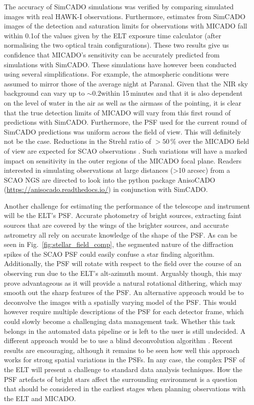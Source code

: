 The accuracy of SimCADO simulations was verified by comparing simulated images with real HAWK-I observations. Furthermore, estimates from SimCADO images of the detection and saturation limits for observations with MICADO fall within 0.1\m of the values given by the ELT exposure time calculator (after normalising the two optical train configurations). These two results give us confidence that MICADO's sensitivity can be accurately predicted from simulations with SimCADO. These simulations have however been conducted using several simplifications. For example, the atmospheric conditions were assumed to mirror those of the average night at Paranal. Given that the NIR sky background can vary up to $\sim 0.2$\m within 15\,minutes \citep{moreels08} and that it is also dependent on the level of water in the air as well as the airmass of the pointing, it is clear that the true detection limits of MICADO will vary from this first round of predictions with SimCADO. Furthermore, the PSF used for the current round of SimCADO predictions was uniform across the field of view. This will definitely not be the case. Reductions in the Strehl ratio of $>50\,\%$ over the MICADO field of view are expected for SCAO observations \citep{clenet2015}. Such variations will have a marked impact on sensitivity in the outer regions of the MICADO focal plane. Readers interested in simulating observations at large distances (>10 arcsec) from a SCAO NGS are directed to look into the python package AnisoCADO (\url{https://anisocado.readthedocs.io/}) in conjunction with SimCADO.

Another challenge for estimating the performance of the telescope and instrument will be the ELT's PSF. Accurate photometry of bright sources, extracting faint sources that are covered by the wings of the brighter sources, and accurate astrometry all rely on accurate knowledge of the shape of the PSF. As can be seen in Fig.~\ref{fig:stellar_field_comp}, the segmented nature of the diffraction spikes of the SCAO PSF could easily confuse a star finding algorithm. Additionally, the PSF will rotate with respect to the field over the course of an observing run due to the ELT's alt-azimuth mount. Arguably though, this may prove advantageous as it will provide a natural rotational dithering, which may smooth out the sharp features of the PSF. An alternative approach would be to deconvolve the images with a spatially varying model of the PSF. This would however require multiple descriptions of the PSF for each detector frame, which could slowly become a challenging data management task. Whether this task belongs in the automated data pipeline or is left to the user is still undecided. A different approach would be to use a blind deconvolution algorithm \citep{vorontsov2017}. Recent results are encouraging, although it remains to be seen how well this approach works for strong spatial variations in the PSFs. In any case, the complex PSF of the ELT will present a challenge to standard data analysis techniques. How the PSF artefacts of bright stars affect the surrounding environment is a question that should be considered in the earliest stages when planning observations with the ELT and MICADO.



